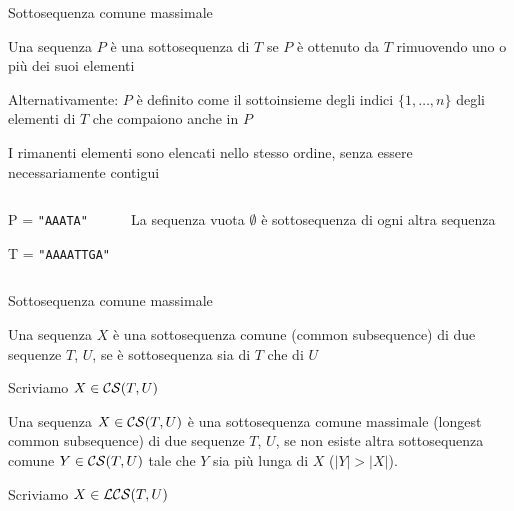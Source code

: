 \begin{frame}{Sottosequenza comune massimale}

\vspace{-9pt}
\begin{myboxtitle}
\BIL
\item Una sequenza $P$ è una \alert{sottosequenza} di $T$ se $P$ è ottenuto da $T$
rimuovendo uno o più dei suoi elementi
\item Alternativamente: $P$ è definito come il sottoinsieme degli indici $\{ 1, \ldots, n \}$
degli elementi di $T$ che compaiono anche in $P$
\item I rimanenti elementi sono elencati nello stesso ordine, senza essere necessariamente contigui
\EIL
\end{myboxtitle}

\vspace{-9pt}
\begin{columns}[T]
\begin{myboxtitle}[Esempi]
\BI
\item P = \texttt{"AAATA"}
\item T = \texttt{"\alert{AAA}AT\alert{T}G\alert{A}"}
\EI
\end{myboxtitle}
\begin{myboxtitle}[Note]
\smallskip
La sequenza vuota $\emptyset$ è sottosequenza di ogni altra sequenza
\end{myboxtitle}
\end{columns}

\end{frame}


\begin{frame}{Sottosequenza comune massimale}


\vspace{-9pt}
\begin{myboxtitle}
Una sequenza $X$ è una \alert{sottosequenza comune} (\alert{common subsequence}) di due sequenze $T$, $U$, se è sottosequenza sia di $T$ che di $U$

\BIL
\item Scriviamo $X \in {\cal CS}(T,U)$
\EIL
\end{myboxtitle}

\begin{myboxtitle}
Una sequenza $X \in {\cal CS}(T,U)$ è una \alert{sottosequenza comune massimale} (\alert{longest common subsequence}) di due sequenze $T$, $U$, se non esiste altra sottosequenza comune $Y \in {\cal CS}(T,U)$ tale che $Y$ sia più lunga di $X$ ($|Y|>|X|$).

\BIL
\item Scriviamo $X \in {\cal LCS}(T,U)$
\EIL
\end{myboxtitle}

\end{frame}


